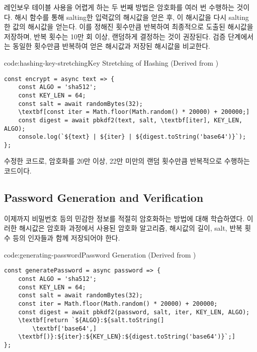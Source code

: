 레인보우 테이블 사용을 어렵게 하는 두 번째 방법은 암호화를 여러 번 수행하는 것이다. 해시 함수를 통해 salting한 입력값의 해시값을 얻은 후, 이 해시값을 다시 salting한 값의 해시값을 얻는다. 이를 정해진 횟수만큼 반복하여 최종적으로 도출된 해시값을 저장하며, 반복 횟수는 10만 회 이상, 랜덤하게 결정하는 것이 권장된다. 검증 단계에서는 동일한 횟수만큼 반복하여 얻은 해시값과 저장된 해시값을 비교한다.

\begin{codeenv}{code:hashing-key-stretching}{Key Stretching of Hashing (Derived from )}
\begin{Verbatim}[commandchars=\\\[\]]
const encrypt = async text => {
    const ALGO = 'sha512';
    const KEY_LEN = 64;
    const salt = await randomBytes(32);
    \textbf[const iter = Math.floor(Math.random() * 20000) + 200000;]
    const digest = await pbkdf2(text, salt, \textbf[iter], KEY_LEN, ALGO);
    console.log(`${text} | ${iter} | ${digest.toString('base64')}`);
};
\end{Verbatim}
\end{codeenv}

\은 \을 수정한 코드로, 암호화를 20만 이상, 22만 미만의 랜덤 횟수만큼 반복적으로 수행하는 코드이다.

\subsection*{Password Generation and Verification}

이제까지 비밀번호 등의 민감한 정보를 적절히 암호화하는 방법에 대해 학습하였다. 이러한 해시값은 암호화 과정에서 사용된 암호화 알고리즘, 해시값의 길이, salt, 반복 횟수 등의 인자들과 함께 저장되어야 한다.

\begin{codeenv}{code:generating-password}{Password Generation (Derived from )}
\begin{Verbatim}[commandchars=\\\[\]]
const generatePassword = async password => {
    const ALGO = 'sha512';
    const KEY_LEN = 64;
    const salt = await randomBytes(32);
    const iter = Math.floor(Math.random() * 20000) + 200000;
    const digest = await pbkdf2(password, salt, iter, KEY_LEN, ALGO);
    \textbf[return `${ALGO}:${salt.toString(]
        \textbf['base64',]
    \textbf[)}:${iter}:${KEY_LEN}:${digest.toString('base64')}`;]
};
\end{Verbatim}
\end{codeenv}

